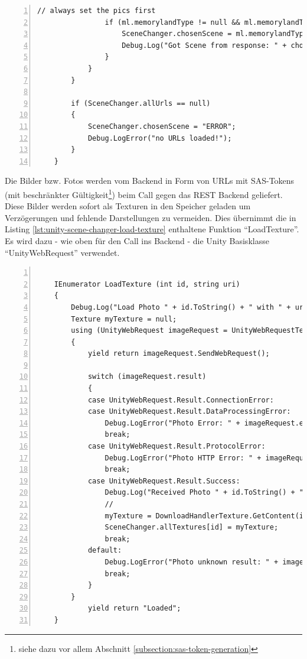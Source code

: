 \begin{lstlisting}[numbers=left,caption={SceneChanger - SetInternals},label={lst:unity-scene-changer-set-internals}]
                // always set the pics first
                if (ml.memorylandType != null && ml.memorylandType.name != null ) {
                    SceneChanger.chosenScene = ml.memorylandType.name;
                    Debug.Log("Got Scene from response: " + chosenScene);
                }
            }
        }
        
        if (SceneChanger.allUrls == null) 
        {
            SceneChanger.chosenScene = "ERROR";
            Debug.LogError("no URLs loaded!");
        }
    }    
\end{lstlisting}
    
Die Bilder bzw. Fotos werden vom Backend in Form von URLs mit SAS-Tokens (mit beschränkter Gültigkeit\footnote{siehe dazu vor allem Abschnitt \ref{subsection:sas-token-generation}}) beim Call gegen das REST Backend geliefert. Diese Bilder werden sofort als Texturen in den Speicher geladen um Verzögerungen und fehlende Darstellungen zu vermeiden. Dies übernimmt die in Listing \ref{lst:unity-scene-changer-load-texture} enthaltene Funktion ``LoadTexture''. Es wird dazu - wie oben für den Call ins Backend - die Unity Basisklasse ``UnityWebRequest'' verwendet.


\begin{lstlisting}[numbers=left,caption={SceneChanger - LoadTexture},label={lst:unity-scene-changer-load-texture}]
  
    IEnumerator LoadTexture (int id, string uri)
    {
        Debug.Log("Load Photo " + id.ToString() + " with " + uri);
        Texture myTexture = null;
        using (UnityWebRequest imageRequest = UnityWebRequestTexture.GetTexture(uri))
        {
            yield return imageRequest.SendWebRequest();
            
            switch (imageRequest.result)
            {
            case UnityWebRequest.Result.ConnectionError:
            case UnityWebRequest.Result.DataProcessingError:
                Debug.LogError("Photo Error: " + imageRequest.error);
                break;
            case UnityWebRequest.Result.ProtocolError:
                Debug.LogError("Photo HTTP Error: " + imageRequest.error);
                break;
            case UnityWebRequest.Result.Success:
                Debug.Log("Received Photo " + id.ToString() + " with " + uri);
                //
                myTexture = DownloadHandlerTexture.GetContent(imageRequest);
                SceneChanger.allTextures[id] = myTexture;
                break;
            default:
                Debug.LogError("Photo unknown result: " + imageRequest.result.ToString());
                break;
            }	    
        }
            yield return "Loaded";
    }
\end{lstlisting}
    

